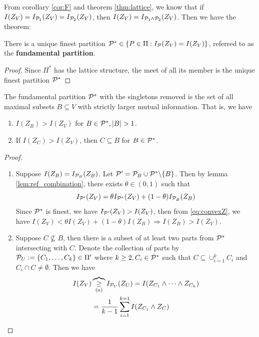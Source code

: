 \documentclass{article}
\begin{document}
From corollary \ref{cor:F} and theorem \ref{thm:lattice}, we know that if $I(Z_V) = I_{\P_1}(Z_V) = I_{\P_2}(Z_V)$, then $I(Z_V) = I_{\P_1 \wedge \P_2}(Z_V)$. Then we have the theorem:
\begin{theorem}
There is a unique finest partition $\P^* \in \{ P \in \Pi: I_{\P}(Z_V) = I(Z_V)\}$, referred to as the \textbf{fundamental partition}.
\end{theorem}
\begin{proof}
Since $\Pi^*$ has the lattice structure, the meet of all its member is the unique finest partition $\P^*$
\end{proof}
\begin{theorem}\label{thm:strict_larger_mi}
The fundamental partition $\P^*$ with the singletons removed is the set of all maximal subsets $B \subseteq V$ with strictly larger mutual information. 
That is, we have
\begin{enumerate}
\item $I(Z_B) > I(Z_V)$ for $B \in \P^*, \abs{B}>1$.
\item If $I(Z_C) > I(Z_V)$, then $C\subseteq B$ for $B \in \P^*$.
\end{enumerate}
\end{theorem}
\begin{proof}
\begin{enumerate}
\item
Suppose $I(Z_B)=I_{\P_B}(Z_B)$.
Let $\P' = \P_B \cup  \P^* \backslash \{B\}$.
Then by lemma \ref{lem:ref_combination}, there exists $\theta \in (0,1)$ such that 
\begin{equation}\label{eq:convexZ}
I_{\P'}(Z_V) = \theta I_{\P^*}(Z_V) + (1-\theta) I_{\P_B}(Z_B)
\end{equation}
Since $\P^*$ is finest, we have $I_{\P'}(Z_V) > I(Z_V)$, then from \eqref{eq:convexZ}, we have 
$I(Z_V) < \theta I(Z_V) + (1-\theta) I(Z_B) \Rightarrow I(Z_B) > I(Z_V)$.

\item Suppose $C \not\subseteq B$, then there is a subset of at least two parts from $\P^*$ intersecting with $C$. Denote the collection of parts by $\P_U :=\{C_1, \dots, C_k\} \in \Pi'$ where 
$k \geq 2, C_i \in \P^* $ such that $C \subseteq \cup_{i=1}^k C_i$ and $C_i \cap C \neq \emptyset$.
Then we have
\begin{align*}
I(Z_V) & \overbrace{\geq}_{(a)} I_{\P_U}(Z_U)  = I(Z_{C_1} \wedge \dots \wedge Z_{C_k})\\
& = {1\over k-1}\sum_{i=1}^{k=1} I(Z_{C_1} \wedge Z_{C})
\end{align*}
\end{enumerate}
\end{proof}
\end{document}
